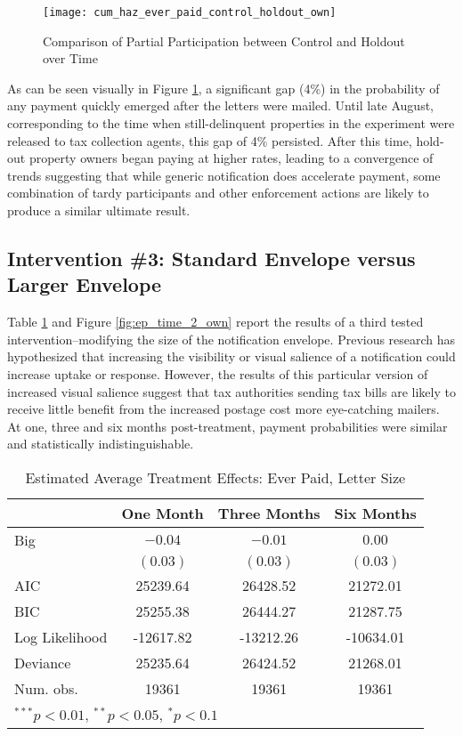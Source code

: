 \documentclass[12pt,titlepage]{article}
\begin{document}
\begin{figure}[htpb]
\begin{center}
\caption{Comparison of Partial Participation between Control and Holdout over Time}
\label{fig:ep_time_ch_own}
\bigskip
\texttt{[image: cum\_haz\_ever\_paid\_control\_holdout\_own]}
\end{center}
\end{figure}


As can be seen visually in Figure \ref{fig:ep_time_ch_own}, 
a significant gap (4\%) in the probability 
of any payment quickly emerged after the letters were mailed. Until 
late August, corresponding to the time when still-delinquent properties 
in the experiment were released to tax collection agents, this gap of 
4\% persisted. After this time, hold-out property owners began paying 
at higher rates, leading to a convergence of trends suggesting that 
while generic notification does accelerate payment, some
combination of tardy participants and other enforcement actions are 
likely to produce a similar ultimate result. 

\subsection{Intervention \#3: Standard Envelope versus Larger Envelope}

Table \ref{tbl:reg2_ep} and Figure \ref{fig:ep_time_2_own} 
report the results of a third tested
intervention--modifying the size of the notification envelope.
Previous research has hypothesized that increasing the visibility or visual 
salience of a notification could increase uptake or response.
However, the results of this particular version of increased visual salience 
suggest that tax authorities sending tax bills are likely to receive little 
benefit from the increased postage cost more eye-catching mailers. 
At one, three and six months post-treatment, payment probabilities 
were similar and statistically indistinguishable. 
\begin{table}[htbp]
\caption{Estimated Average Treatment Effects: Ever Paid, Letter Size}
\begin{center}
\begin{tabular}{l c c c }
\hline
               & One Month & Three Months & Six Months \\
\hline
Big            & $-0.04$   & $-0.01$   & $0.00$    \\
               & $(0.03)$  & $(0.03)$  & $(0.03)$  \\
\hline
AIC            & 25239.64  & 26428.52  & 21272.01  \\
BIC            & 25255.38  & 26444.27  & 21287.75  \\
Log Likelihood & -12617.82 & -13212.26 & -10634.01 \\
Deviance       & 25235.64  & 26424.52  & 21268.01  \\
Num. obs.      & 19361     & 19361     & 19361     \\
\hline
\multicolumn{4}{l}{\scriptsize{$^{***}p<0.01$, $^{**}p<0.05$, $^*p<0.1$}}
\end{tabular}
\label{tbl:reg2_ep}
\end{center}
\end{table}
\end{document}
